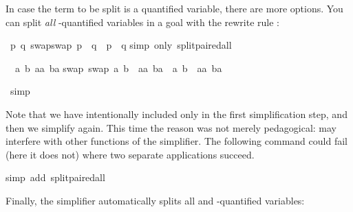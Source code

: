 \begin{isabellebody}
\begin{isamarkuptxt}
In case the term to be split is a quantified variable, there are more options.
You can split \emph{all} \isa{{\isasymAnd}}-quantified variables in a goal
with the rewrite rule :%
\end{isamarkuptxt}%
\isamarkuptrue%
\isamarkupfalse%
\ {\isachardoublequote}{\isasymAnd}p\ q{\isachardot}\ swap{\isacharparenleft}swap\ p{\isacharparenright}\ {\isacharequal}\ q\ {\isasymlongrightarrow}\ p\ {\isacharequal}\ q{\isachardoublequote}\isanewline
\isamarkupfalse%
simp\ only{\isacharcolon}\ split{\isacharunderscore}paired{\isacharunderscore}all{\isacharparenright}\isamarkupfalse%
%
\begin{isamarkuptxt}%
\noindent
\begin{isabelle}%
\ {}{\isachardot}\ {\isasymAnd}a\ b\ aa\ ba{\isachardot}\isanewline
{}swap\ {\isacharparenleft}swap\ {\isacharparenleft}a{\isacharcomma}\ b{\isacharparenright}{\isacharparenright}\ {\isacharequal}\ {\isacharparenleft}aa{\isacharcomma}\ ba{\isacharparenright}\ {\isasymlongrightarrow}\ {\isacharparenleft}a{\isacharcomma}\ b{\isacharparenright}\ {\isacharequal}\ {\isacharparenleft}aa{\isacharcomma}\ ba{\isacharparenright}%
\end{isabelle}%
\end{isamarkuptxt}%
\isamarkuptrue%
\ simp\isanewline
\isamarkupfalse%
\isamarkupfalse%
%
\begin{isamarkuptext}%
\noindent
Note that we have intentionally included only 
in the first simplification step, and then we simplify again. 
This time the reason was not merely
pedagogical:
 may interfere with other functions
of the simplifier.
The following command could fail (here it does not)
where two separate  applications succeed.%
\end{isamarkuptext}%
\isamarkuptrue%
\isamarkupfalse%
simp\ add{\isacharcolon}\ split{\isacharunderscore}paired{\isacharunderscore}all{\isacharparenright}\isanewline
\isamarkupfalse%
\isamarkupfalse%
%
\begin{isamarkuptext}%
\noindent
Finally, the simplifier automatically splits all \isa{{\isasymforall}} and
\isa{{\isasymexists}}-quantified variables:%
\end{isamarkuptext}%

\end{isabellebody}
